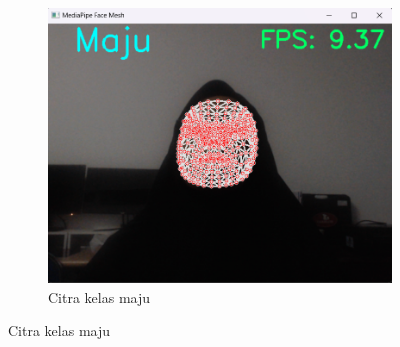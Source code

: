 \begin{figure}[H]
  \begin{subfigure}{0.3\textwidth}
      \centering
      \includegraphics[width=\linewidth]{gambar/15 maju.png}
      \caption{Citra kelas maju}
      \label{fig:image3}
  \end{subfigure}
  

\end{figure}
